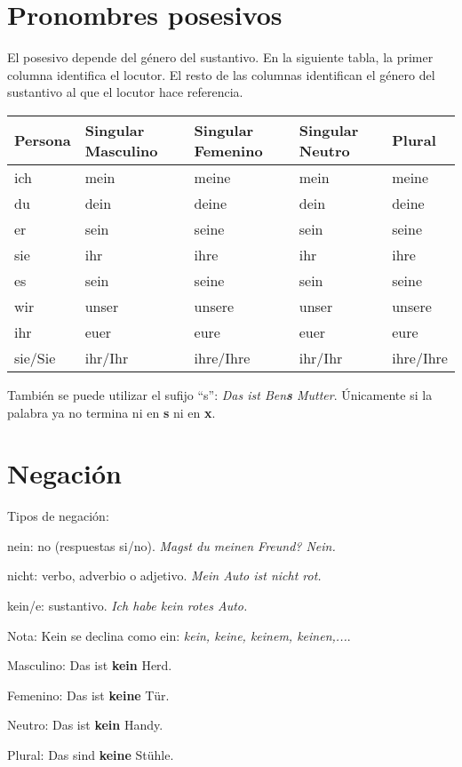 \section{Pronombres posesivos}
El posesivo depende del género del sustantivo. En la siguiente tabla, la primer columna identifica el locutor. El resto de las columnas identifican el género del sustantivo al que el locutor hace referencia.
\begin{tabular}{|l | l l l l|}
\hline
\textbf{Persona} & \textbf{Singular Masculino} & \textbf{Singular Femenino} & \textbf{Singular Neutro} & \textbf{Plural}\\
\hline
ich & mein & meine & mein & meine \\
du & dein & deine & dein & deine \\
er & sein & seine & sein & seine \\
sie & ihr & ihre & ihr & ihre \\
es & sein & seine & sein & seine \\
wir & unser & unsere & unser & unsere \\
ihr & euer & eure & euer & eure \\
sie/Sie & ihr/Ihr &  ihre/Ihre & ihr/Ihr &  ihre/Ihre \\
\hline
\end{tabular}

También se puede utilizar el sufijo ``s'': \textit{Das ist Ben\textbf{s} Mutter}. Únicamente si la palabra ya no termina ni en \textbf{s} ni en \textbf{x}.

\section{Negación}

Tipos de negación:
\begin{myitemize}
\item nein: no (respuestas si/no). \textit{Magst du meinen Freund? Nein.}
\item nicht: verbo, adverbio o adjetivo. \textit{Mein Auto ist nicht rot.}
\item kein/e: sustantivo. \textit{Ich habe kein rotes Auto.}
\end{myitemize}
Nota: Kein se declina como ein: \textit{kein, keine, keinem, keinen,...}.

\begin{myitemize}
\item Masculino: Das ist \textbf{kein} Herd.
\item Femenino: Das ist \textbf{keine} Tür.
\item Neutro: Das ist \textbf{kein} Handy.
\item Plural: Das sind \textbf{keine} Stühle.
\end{myitemize}


